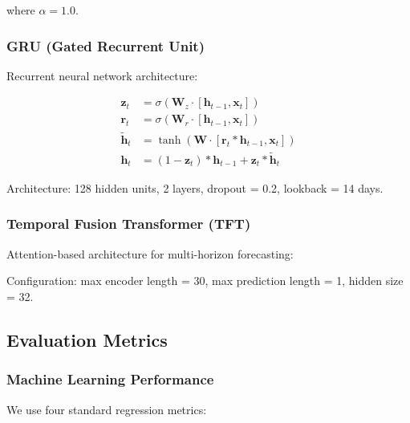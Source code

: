 \documentclass[11pt,a4paper]{article}
\begin{document}
where $\alpha = 1.0$.

\subsubsection{GRU (Gated Recurrent Unit)}

Recurrent neural network architecture:

\begin{align}
\mathbf{z}_t &= \sigma(\mathbf{W}_z \cdot [\mathbf{h}_{t-1}, \mathbf{x}_t]) \\
\mathbf{r}_t &= \sigma(\mathbf{W}_r \cdot [\mathbf{h}_{t-1}, \mathbf{x}_t]) \\
\tilde{\mathbf{h}}_t &= \tanh(\mathbf{W} \cdot [\mathbf{r}_t * \mathbf{h}_{t-1}, \mathbf{x}_t]) \\
\mathbf{h}_t &= (1 - \mathbf{z}_t) * \mathbf{h}_{t-1} + \mathbf{z}_t * \tilde{\mathbf{h}}_t
\end{align}

Architecture: 128 hidden units, 2 layers, dropout = 0.2, lookback = 14 days.

\subsubsection{Temporal Fusion Transformer (TFT)}

Attention-based architecture for multi-horizon forecasting:

Configuration: max encoder length = 30, max prediction length = 1, hidden size = 32.

\subsection{Evaluation Metrics}

\subsubsection{Machine Learning Performance}

We use four standard regression metrics:
\end{document}
